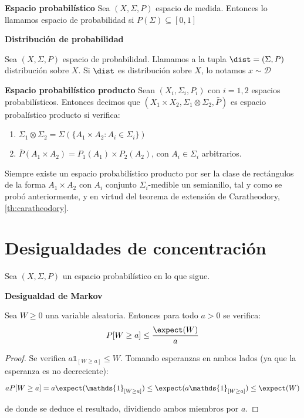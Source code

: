 \begin{definition} \textbf{Espacio probabilístico}
 Sea $(X, \Sigma, P)$ espacio de medida. Entonces lo llamamos espacio de probabilidad si $P(\Sigma)\subseteq [0,1]$
\end{definition}


\begin{definition} \textbf{Distribución de probabilidad}

 Sea $(X, \Sigma, P)$ espacio de probabilidad. Llamamos a la tupla $\dist = (\Sigma,P)$ distribución sobre $X$. 
 Si $\dist$ es distribución sobre $X$, lo notamos $x\sim \mathcal{D}$
\end{definition}

\begin{definition} \textbf{Espacio probabilístico producto}
 Sean $(X_i, \Sigma_i, P_i)$ con $i=1,2$ espacios probabilísticos. Entonces decimos que 
 $(X_1 \times X_2, \Sigma_1 \otimes \Sigma_2, \bar{P})$ es espacio probalístico producto si verifica:
 
 \begin{enumerate}[i]
  \item $\Sigma_1 \otimes \Sigma_2 = \Sigma\left(\{A_1 \times A_2: A_i\in \Sigma_i\}\right)$
  \item $\bar{P}(A_1 \times A_2) = P_1(A_1) \times P_2(A_2)$, con $A_i\in \Sigma_i$ arbitrarios.
 \end{enumerate}
\end{definition}

Siempre existe un espacio probabilístico producto por ser la clase de rectángulos de la forma $A_1 \times A_2$
con $A_i$ conjunto $\Sigma_i$-medible un semianillo, tal y como se probó anteriormente, y en virtud del teorema
de extensión de Caratheodory, \ref{th:caratheodory}.

\section{Desigualdades de concentración}
Sea $(X,\Sigma,P)$ un espacio probabilístico en lo que sigue.

\begin{lemma} \textbf{Desigualdad de Markov}

Sea $W \ge 0$ una variable aleatoria. Entonces para todo $a > 0$ se verifica:
\[P[W \ge a] \le \frac{\expect(W)}{a}\]

\label{ineq:markov}
\end{lemma}

\begin{proof}
 Se verifica $a\mathds{1}_{[W\ge a]} \le W$. Tomando esperanzas en ambos lados (ya que la esperanza es no 
 decreciente):
 
 \[aP[W\ge a] = a\expect(\mathds{1}_{[W\ge a]}) \le \expect(a\mathds{1}_{[W\ge a]}) \le \expect(W)\]
 
 de donde se deduce el resultado, dividiendo ambos miembros por $a$.
\end{proof}

